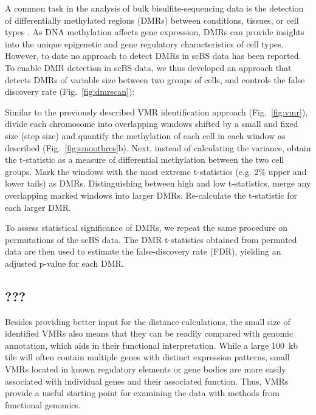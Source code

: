 \documentclass[twocolumn,10pt]{article}
\begin{document}
A common task in the analysis of bulk bisulfite-sequencing data is the detection of differentially methylated regions (DMRs) between conditions, tissues, or cell types \citep{Hebestreit2013, dmrseq}.
As DNA methylation affects gene expression, DMRs can provide insights into the unique epigenetic and gene regulatory characteristics of cell types.
However, to date no approach to detect DMRs in scBS data has been reported.
To enable DMR detection in scBS data, we thus developed an approach that detects DMRs of variable size between two groups of cells, and controls the false discovery rate (Fig.~\ref{fig:dmrscan}):

Similar to the previously described VMR identification approach (Fig.~\ref{fig:vmr}), divide each chromosome into overlapping windows shifted by a small and fixed size (step size) and quantify the methylation of each cell in each window as described (Fig.~\ref{fig:smoothres}b).
Next, instead of calculating the variance, obtain the t-statistic %
as a measure of differential methylation between the two cell groups.
Mark the windows with the most extreme t-statistics (e.g. 2\% upper and lower tails) as DMRs.
Distinguishing between high and low t-statistics, merge any overlapping marked windows into larger DMRs.
Re-calculate the t-statistic for each larger DMR.



To assess statistical significance of DMRs, we repeat the same procedure on permutations of the scBS data.
The DMR t-statistics obtained from permuted data are then used to estimate the false-discovery rate (FDR), yielding an adjusted p-value for each DMR.



\subsection{???}  %

Besides providing better input for the distance calculations, the small size of identified VMRs also means that they can be readily compared with genomic annotation, which aids in their functional interpretation.
While a large 100~kb tile will often contain multiple genes with distinct expression patterns, small VMRs located in known regulatory elements or gene bodies are more easily associated with individual genes and their associated function.
Thus, VMRs provide a useful starting point for examining the data with methods from functional genomics.
\end{document}
